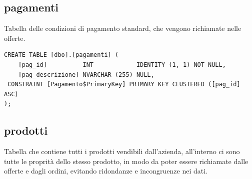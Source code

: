 \documentclass[12pt]{article}
\begin{document}
\subsection{pagamenti}
Tabella delle condizioni di pagamento standard, che vengono richiamate nelle offerte.
\begin{lstlisting}
CREATE TABLE [dbo].[pagamenti] (
    [pag_id]          INT            IDENTITY (1, 1) NOT NULL,
    [pag_descrizione] NVARCHAR (255) NULL,
 CONSTRAINT [Pagamento$PrimaryKey] PRIMARY KEY CLUSTERED ([pag_id] ASC)
);
\end{lstlisting}

\subsection{prodotti}
Tabella che contiene tutti i prodotti vendibili dall'azienda, all'interno ci sono tutte le proprità dello stesso prodotto,
in modo da poter essere richiamate dalle offerte e dagli ordini, evitando ridondanze e incongruenze nei dati.
\end{document}
